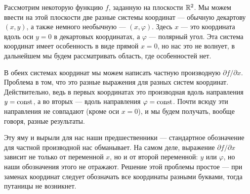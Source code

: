 Рассмотрим некоторую функцию $f$, заданную на плоскости $\mathbb{R}^2$. Мы можем ввести на этой плоскости две разные системы координат --- обычную декартову $(x, y)$, а также немного необычную --- $(x, \varphi)$. Здесь $x$ --- это координата вдоль оси $y = 0$ в декартовых координатах, а $\varphi$ --- полярный угол. Эта система координат имеет особенность в виде прямой $x = 0$, но нас это не волнует, в дальнейшем мы будем рассматривать область, где особенностей нет.

В обеих системах координат мы можем написать частную производную $\partial f / \partial x$. Проблема в том, что это разные выражения для разных систем координат. Действительно, ведь в первых координатах это производная вдоль направления $y = \mathrm{const}$, а во вторых --- вдоль направления $\varphi = \mathrm{const}$. Почти всюду эти направления не совпадают (кроме оси $x = 0$), и мы будем получать, вообще говоря, разные результаты.

Эту яму и вырыли для нас наши предшественники --- стандартное обозначение для частной производной нас обманывает. На самом деле, выражение $\partial f / \partial x$ зависит не только от переменной $x$, но и от второй переменной: $y$ или $\varphi$, но наши обозначения этого не отражают. Решение этой проблемы простое --- при заменах координат следует обозначать все координаты разными буквами, тогда путаницы не возникнет.

